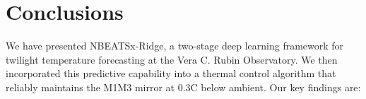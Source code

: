 \documentclass[twocolumn]{aastex631}
\begin{document}

\section{Conclusions}
\label{sec:conclusions}

We have presented NBEATSx-Ridge, a two-stage deep learning framework for twilight temperature forecasting at the Vera C. Rubin Observatory. We then incorporated this predictive capability into a thermal control algorithm that reliably maintains the M1M3 mirror at 0.3C below ambient. Our key findings are:
\end{document}
